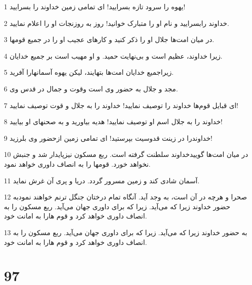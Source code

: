 \par 1 یهوه را سرود تازه بسرایید! ای تمامی زمین خداوند را بسرایید!
\par 2 خداوند رابسرایید و نام او را متبارک خوانید! روز به روزنجات او را اعلام نمایید.
\par 3 در میان امت‌ها جلال او را ذکر کنید و کارهای عجیب او را در جمیع قومها.
\par 4 زیرا خداوند، عظیم است و بی‌نهایت حمید. و او مهیب است بر جمیع خدایان.
\par 5 زیراجمیع خدایان امت‌ها بتهایند، لیکن یهوه آسمانهارا آفرید.
\par 6 مجد و جلال به حضور وی است وقوت و جمال در قدس وی.
\par 7 ‌ای قبایل قوم‌ها خداوند را توصیف نمایید! خداوند را به جلال و قوت توصیف نمایید!
\par 8 خداوند را به جلال اسم او توصیف نمایید! هدیه بیاورید و به صحنهای او بیایید!
\par 9 خداوندرا در زینت قدوسیت بپرستید! ای تمامی زمین ازحضور وی بلرزید! 
\par 10 در میان امت‌ها گوییدخداوند سلطنت گرفته است. ربع مسکون نیزپایدار شد و جنبش نخواهد خورد. قومها را به انصاف داوری خواهد نمود.
\par 11 آسمان شادی کند و زمین مسرور گردد. دریا و پری آن غرش نماید.
\par 12 صحرا و هر‌چه در آن است، به وجد آید. آنگاه تمام درختان جنگل ترنم خواهند نمودبه حضور خداوند زیرا که می‌آید. زیرا که برای داوری جهان می‌آید. ربع مسکون را به انصاف داوری خواهد کرد و قوم هارا به امانت خود.
\par 13 به حضور خداوند زیرا که می‌آید. زیرا که برای داوری جهان می‌آید. ربع مسکون را به انصاف داوری خواهد کرد و قوم هارا به امانت خود.
 
\chapter{97}

